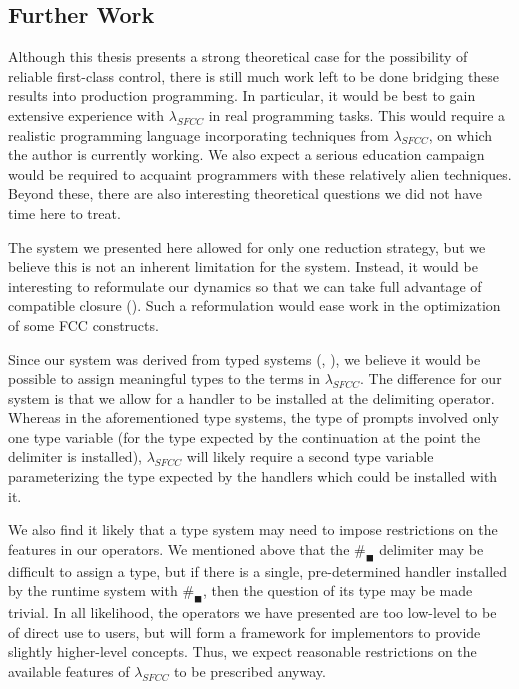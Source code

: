 \documentclass[11pt]{article}
\begin{document}
\subsection{Further Work}

Although this thesis presents a strong theoretical case for the possibility of reliable first-class control, there is still much work left to be done bridging these results into production programming.
In particular, it would be best to gain extensive experience with $\lambda_{SFCC}$ in real programming tasks.
This would require a realistic programming language incorporating techniques from $\lambda_{SFCC}$, on which the author is currently working.
We also expect a serious education campaign would be required to acquaint programmers with these relatively alien techniques.
Beyond these, there are also interesting theoretical questions we did not have time here to treat.

The system we presented here allowed for only one reduction strategy, but we believe this is not an inherent limitation for the system.
Instead, it would be interesting to reformulate our dynamics so that we can take full advantage of compatible closure (\cite{LambdaWithTypes}).
Such a reformulation would ease work in the optimization of some FCC constructs.

Since our system was derived from typed systems (\cite{MFDC}, \cite{Gunter:1995}), we believe it would be possible to assign meaningful types to the terms in $\lambda_{SFCC}$.
The difference for our system is that we allow for a handler to be installed at the delimiting operator.
Whereas in the aforementioned type systems, the type of prompts involved only one type variable (for the type expected by the continuation at the point the delimiter is installed), $\lambda_{SFCC}$ will likely require a second type variable parameterizing the type expected by the handlers which could be installed with it.

We also find it likely that a type system may need to impose restrictions on the features in our operators.
We mentioned above that the $\#_\blacksquare$ delimiter may be difficult to assign a type, but if there is a single, pre-determined handler installed by the runtime system with $\#_\blacksquare$, then the question of its type may be made trivial.
In all likelihood, the operators we have presented are too low-level to be of direct use to users, but will form a framework for implementors to provide slightly higher-level concepts.
Thus, we expect reasonable restrictions on the available features of $\lambda_{SFCC}$ to be prescribed anyway.
\end{document}
